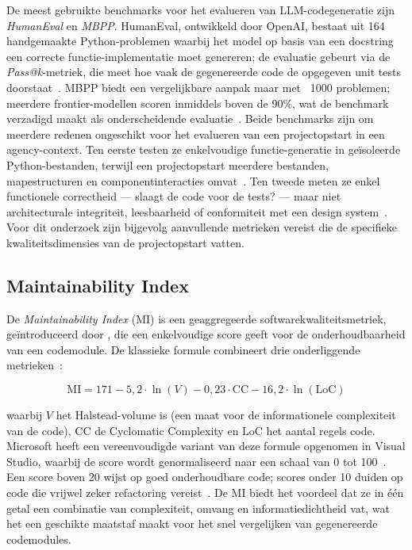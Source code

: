 De meest gebruikte benchmarks voor het evalueren van LLM-codegeneratie zijn \textit{HumanEval} en \textit{MBPP}. HumanEval, ontwikkeld door OpenAI, bestaat uit 164 handgemaakte Python-problemen waarbij het model op basis van een docstring een correcte functie-implementatie moet genereren; de evaluatie gebeurt via de \textit{Pass@k}-metriek, die meet hoe vaak de gegenereerde code de opgegeven unit tests doorstaat~\autocite{DataCamp2024}. MBPP biedt een vergelijkbare aanpak maar met ~1000 problemen; meerdere frontier-modellen scoren inmiddels boven de 90\%, wat de benchmark verzadigd maakt als onderscheidende evaluatie~\autocite{Blaxel2026}. Beide benchmarks zijn om meerdere redenen ongeschikt voor het evalueren van een projectopstart in een agency-context. Ten eerste testen ze enkelvoudige functie-generatie in geïsoleerde Python-bestanden, terwijl een projectopstart meerdere bestanden, mapestructuren en componentinteracties omvat~\autocite{Blaxel2026}. Ten tweede meten ze enkel functionele correctheid --- slaagt de code voor de tests? --- maar niet architecturale integriteit, leesbaarheid of conformiteit met een design system~\autocite{DevTo2026}. Voor dit onderzoek zijn bijgevolg aanvullende metrieken vereist die de specifieke kwaliteitsdimensies van de projectopstart vatten.

\subsection{Maintainability Index}
\label{subsec:maintainability-index}

De \textit{Maintainability Index} (MI) is een geaggregeerde softwarekwaliteitsmetriek, geïntroduceerd door \textcite{Oman1992}, die een enkelvoudige score geeft voor de onderhoudbaarheid van een codemodule. De klassieke formule combineert drie onderliggende metrieken~\autocite{ObjectScript}:

\[
\text{MI} = 171 - 5{,}2 \cdot \ln(V) - 0{,}23 \cdot \text{CC} - 16{,}2 \cdot \ln(\text{LoC})
\]

waarbij \(V\) het Halstead-volume is (een maat voor de informationele complexiteit van de code), \(\text{CC}\) de Cyclomatic Complexity en \(\text{LoC}\) het aantal regels code. Microsoft heeft een vereenvoudigde variant van deze formule opgenomen in Visual Studio, waarbij de score wordt genormaliseerd naar een schaal van 0 tot 100~\autocite{Microsoft2025}. Een score boven 20 wijst op goed onderhoudbare code; scores onder 10 duiden op code die vrijwel zeker refactoring vereist~\autocite{Microsoft2025}. De MI biedt het voordeel dat ze in één getal een combinatie van complexiteit, omvang en informatiedichtheid vat, wat het een geschikte maatstaf maakt voor het snel vergelijken van gegenereerde codemodules.

